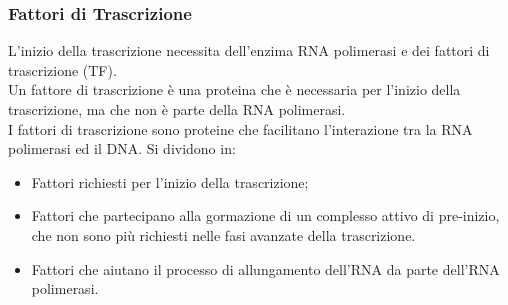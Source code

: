 \documentclass{article}
\begin{document}
\subsubsection{Fattori di Trascrizione}
L'inizio della trascrizione necessita dell'enzima RNA polimerasi e dei fattori di trascrizione (TF).\\
Un fattore di trascrizione è una proteina che è necessaria per l'inizio della trascrizione, ma che non è parte della RNA polimerasi.\\
I fattori di trascrizione sono proteine che facilitano l'interazione tra la RNA polimerasi ed il DNA.
Si dividono in:
\begin{itemize}
    \item Fattori richiesti per l'inizio della trascrizione;
    \item Fattori che partecipano alla gormazione di un complesso attivo di pre-inizio, che non  sono più richiesti nelle fasi avanzate della trascrizione.
    \item Fattori che aiutano il processo di allungamento dell'RNA da parte dell'RNA polimerasi.
\end{itemize}
\end{document}
